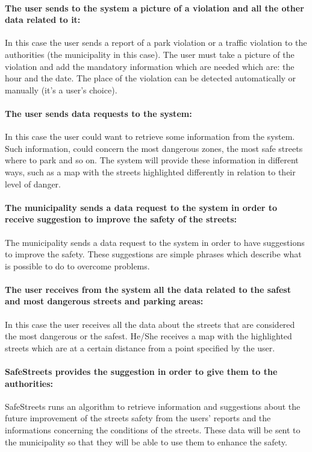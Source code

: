 \documentclass[titlepage]{article}
\begin{document}
\paragraph{The user sends to the system a picture of a            	violation and all the other data related to it: }
In this case the user sends a report of a park violation or a traffic violation to the authorities (the municipality in this case). The user must take a picture of the violation and add the mandatory information which are needed which are: the hour and the date. The place of the violation can be detected automatically or manually (it's a user's choice).
\paragraph{The user sends data requests to the system: }
In this case the user could want to retrieve some information from the system. Such information, could concern the most dangerous zones, the most safe streets where to park and so on. The system will provide these information in different ways, such as a map with the streets highlighted differently in relation to their level of danger.
\paragraph{The municipality sends a data request to the 				   system  in order to receive suggestion to improve 			   the 	safety 	of the streets: }
The municipality sends a data request to the system in order to have suggestions to improve the safety. These suggestions are simple phrases which describe what is possible to do to overcome problems.

\paragraph{The user receives from the system all the data 			related to the safest and most dangerous streets and parking areas: }
In this case the user receives all the data about the streets that are considered the most dangerous or the safest. He/She receives a map with the highlighted streets which are at a certain distance from a point specified by the user.

\paragraph{SafeStreets provides the suggestion in order to give them to the authorities: }
SafeStreets runs an algorithm to retrieve information and suggestions about the future improvement of the streets safety from the users' reports and the informations concerning the conditions of the streets. These data will be sent to the municipality so that they will be able to use them to enhance the safety.
\end{document}
